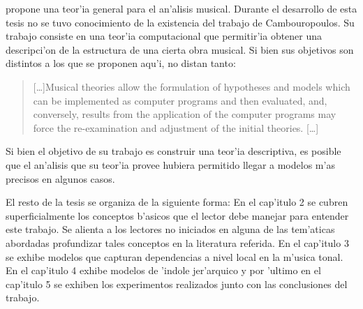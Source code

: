 %

\cite{Cambouropoulos98} propone una teor'ia general para el an'alisis musical. Durante el desarrollo de esta tesis no se tuvo conocimiento de la existencia del trabajo de Cambouropoulos.
Su trabajo consiste en una teor'ia computacional que permitir'ia obtener una descripci'on de la estructura de una cierta obra musical. Si bien sus 
objetivos son distintos a los que se proponen aqu'i, no distan tanto: 
\begin{quote}
[\ldots]Musical theories allow the formulation of hypotheses and models which can be implemented
as computer programs and then evaluated, and, conversely, results from the application of the
computer programs may force the re-examination and adjustment of the initial theories. [\ldots]
\end{quote} 
Si bien el objetivo de su trabajo es construir una teor'ia descriptiva, es posible que el an'alisis que su teor'ia provee hubiera permitido llegar a modelos m'as precisos 
en algunos casos. 

%
%

El resto de la tesis se organiza de la siguiente forma: En el cap'itulo 2 se cubren superficialmente los conceptos b'asicos que el lector debe manejar para entender
este trabajo. Se alienta a los lectores no iniciados en alguna de las tem'aticas abordadas profundizar tales conceptos en la literatura referida. 
En el cap'itulo 3 se exhibe modelos que capturan dependencias a nivel local en la m'usica tonal. 
En el cap'itulo 4 exhibe modelos de 'indole jer'arquico y por 'ultimo en el cap'itulo 5 se exhiben los experimentos realizados junto con 
las conclusiones del trabajo.
